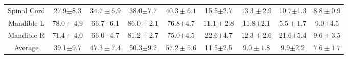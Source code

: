 \begin{table}[t!]
{\begin{subtable}{1\textwidth}
{\begin{tabular}{ccccccccc}
    Spinal Cord      & 27.9$\pm$8.3       & $\bm{34.7\pm6.9}$  & 38.0$\pm$7.7       & $\bm{40.3\pm6.1}$ & 15.5$\pm$2.7      & $\bm{13.3\pm2.9}$ & 10.7$\pm$1.3     & $\bm{8.8\pm0.9}$ \\
    Mandible L       & $\bm{78.0\pm4.9}$  & 66.7$\pm$6.1       & $\bm{86.0\pm2.1}$  & 76.8$\pm$4.7      & $\bm{11.1\pm2.8}$ & 11.8$\pm2.1$      & $\bm{5.5\pm1.7}$ & 9.0$\pm$4.5      \\
    Mandible R       & $\bm{71.4\pm4.0}$  & 66.0$\pm$4.7       & $\bm{81.2\pm2.7}$  & 75.0$\pm$4.5      & 22.6$\pm$4.7      & $\bm{12.3\pm2.6}$ & 21.6$\pm$5.4     & $\bm{9.6\pm3.5}$ \\ \hline
    Average          & 39.1$\pm$9.7       & $\bm{47.3\pm7.4}$ & 50.3$\pm$9.2       & $\bm{57.2\pm5.6}$ & 11.5$\pm$2.5      & $\bm{9.0\pm1.8}$  & 9.9$\pm$2.2      & $\bm{7.6\pm1.7}$ \\ 
    \bottomrule[1.5pt]
    \end{tabular}}
    \end{subtable}}
    
    \vspace{0.2cm}
    

\end{table}
